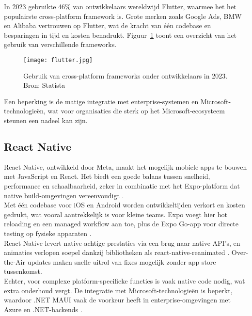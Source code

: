 In 2023 gebruikte 46\% van ontwikkelaars wereldwijd Flutter, waarmee het het populairste cross-platform framework is. Grote merken zoals Google Ads, BMW en Alibaba vertrouwen op Flutter, wat de kracht van één codebase en besparingen in tijd en kosten benadrukt. Figuur~\ref{fig:flutter} toont een overzicht van het gebruik van verschillende frameworks.\\

\begin{figure}[h]
    \centering
    \texttt{[image: flutter.jpg]}
    \caption{Gebruik van cross-platform frameworks onder ontwikkelaars in 2023. Bron: Statista \autocite{Rodriguez2025}}
    \label{fig:flutter}
\end{figure}

Een beperking is de matige integratie met enterprise-systemen en Microsoft-technologieën, wat voor organisaties die sterk op het Microsoft-ecosysteem steunen een nadeel kan zijn.

\subsection{React Native}
React Native, ontwikkeld door Meta, maakt het mogelijk mobiele apps te bouwen met JavaScript en React. Het biedt een goede balans tussen snelheid, performance en schaalbaarheid, zeker in combinatie met het Expo-platform dat native build-omgevingen vereenvoudigt \autocite{Ivanov2025}.\\

Met één codebase voor iOS en Android worden ontwikkeltijden verkort en kosten gedrukt, wat vooral aantrekkelijk is voor kleine teams. Expo voegt hier hot reloading en een managed workflow aan toe, plus de Expo Go-app voor directe testing op fysieke apparaten \autocite{Ivanov2025}.\\

React Native levert native-achtige prestaties via een brug naar native API's, en animaties verlopen soepel dankzij bibliotheken als react-native-reanimated \autocite{Ivanov2025}. Over-the-Air updates maken snelle uitrol van fixes mogelijk zonder app store tussenkomst.\\

Echter, voor complexe platform-specifieke functies is vaak native code nodig, wat extra onderhoud vergt. De integratie met Microsoft-technologieën is beperkt, waardoor .NET MAUI vaak de voorkeur heeft in enterprise-omgevingen met Azure en .NET-backends \autocite{Longe2025}.


